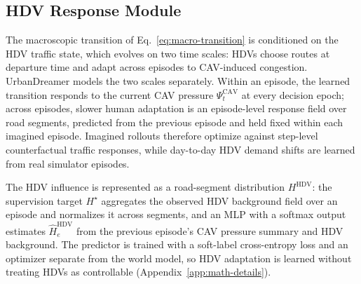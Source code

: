\subsection{HDV Response Module}

The macroscopic transition of Eq.~\ref{eq:macro-transition} is conditioned
on the HDV traffic state, which evolves on two time scales: HDVs choose
routes at departure time and adapt across episodes to CAV-induced
congestion.  UrbanDreamer models the two scales separately.  Within an
episode, the learned transition responds to the current CAV pressure
\(\Psi_t^{\mathrm{CAV}}\) at every decision epoch; across episodes, slower
human adaptation is an episode-level response field over road segments,
predicted from the previous episode and held fixed within each imagined
episode.  Imagined rollouts therefore optimize against step-level
counterfactual traffic responses, while day-to-day HDV demand shifts are
learned from real simulator episodes.

The HDV influence is represented as a road-segment distribution
\(H^{\mathrm{HDV}}\): the supervision target \(H^\star\) aggregates the
observed HDV background field over an episode and normalizes it across
segments, and an MLP with a softmax output estimates
\(\hat H_e^{\mathrm{HDV}}\) from the previous episode's CAV pressure summary
and HDV background.  The predictor is trained with a soft-label
cross-entropy loss and an optimizer separate from the world model, so HDV
adaptation is learned without treating HDVs as controllable
(Appendix~\ref{app:math-details}).





